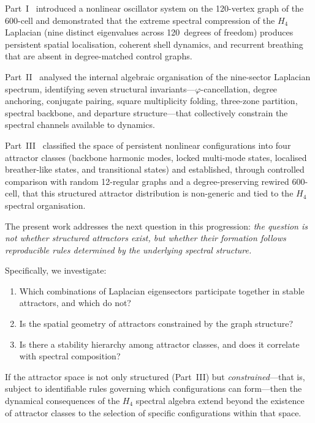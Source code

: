 \documentclass[12pt,a4paper]{article}
\newcommand{\Hfour}{H_4}
\newcommand{\vphi}{\varphi}
\begin{document}
Part~I~\cite{paper1} introduced a nonlinear oscillator system on the
120-vertex graph of the 600-cell and demonstrated that the extreme
spectral compression of the $\Hfour$ Laplacian (nine distinct
eigenvalues across 120~degrees of freedom) produces persistent
spatial localisation, coherent shell dynamics, and recurrent breathing
that are absent in degree-matched control graphs.

Part~II~\cite{paper2} analysed the internal algebraic organisation of
the nine-sector Laplacian spectrum, identifying seven structural
invariants---$\vphi$-cancellation, degree anchoring, conjugate pairing,
square multiplicity folding, three-zone partition, spectral backbone,
and departure structure---that collectively constrain the spectral
channels available to dynamics.

Part~III~\cite{paper3} classified the space of persistent nonlinear
configurations into four attractor classes (backbone harmonic modes,
locked multi-mode states, localised breather-like states, and
transitional states) and established, through controlled comparison
with random 12-regular graphs and a degree-preserving rewired
600-cell, that this structured attractor distribution is non-generic
and tied to the $\Hfour$ spectral organisation.

The present work addresses the next question in this progression:
\emph{the question is not whether structured attractors exist, but
whether their formation follows reproducible rules determined by the
underlying spectral structure.}

Specifically, we investigate:
\begin{enumerate}[nosep]
\item Which combinations of Laplacian eigensectors participate
  together in stable attractors, and which do not?
\item Is the spatial geometry of attractors constrained by the graph
  structure?
\item Is there a stability hierarchy among attractor classes, and
  does it correlate with spectral composition?
\end{enumerate}

If the attractor space is not only structured (Part~III) but
\emph{constrained}---that is, subject to identifiable rules governing
which configurations can form---then the dynamical consequences of the
$\Hfour$ spectral algebra extend beyond the existence of attractor
classes to the selection of specific configurations within that space.
\end{document}
